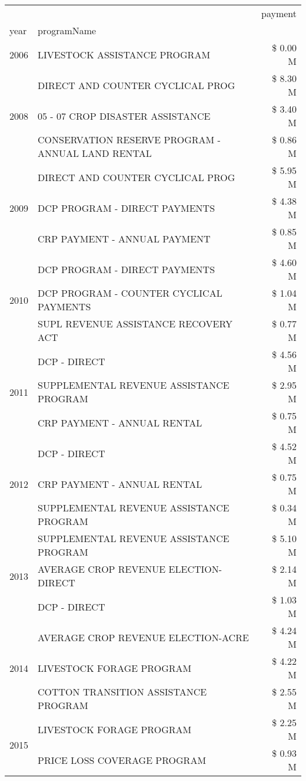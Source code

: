 \begin{tabular}{llr}
\toprule
 &  & payment \\
year & programName &  \\
\midrule
2006 & LIVESTOCK ASSISTANCE PROGRAM & \$ 0.00 M \\
\cline{1-3}
\multirow[t]{3}{*}{2008} & DIRECT AND COUNTER CYCLICAL PROG & \$ 8.30 M \\
 & 05 - 07 CROP DISASTER ASSISTANCE & \$ 3.40 M \\
 & CONSERVATION RESERVE PROGRAM - ANNUAL LAND RENTAL & \$ 0.86 M \\
\cline{1-3}
\multirow[t]{3}{*}{2009} & DIRECT AND COUNTER CYCLICAL PROG & \$ 5.95 M \\
 & DCP PROGRAM - DIRECT PAYMENTS & \$ 4.38 M \\
 & CRP PAYMENT - ANNUAL PAYMENT & \$ 0.85 M \\
\cline{1-3}
\multirow[t]{3}{*}{2010} & DCP PROGRAM - DIRECT PAYMENTS & \$ 4.60 M \\
 & DCP PROGRAM - COUNTER CYCLICAL PAYMENTS & \$ 1.04 M \\
 & SUPL REVENUE ASSISTANCE RECOVERY ACT & \$ 0.77 M \\
\cline{1-3}
\multirow[t]{3}{*}{2011} & DCP - DIRECT & \$ 4.56 M \\
 & SUPPLEMENTAL REVENUE ASSISTANCE PROGRAM & \$ 2.95 M \\
 & CRP PAYMENT - ANNUAL RENTAL & \$ 0.75 M \\
\cline{1-3}
\multirow[t]{3}{*}{2012} & DCP - DIRECT & \$ 4.52 M \\
 & CRP PAYMENT - ANNUAL RENTAL & \$ 0.75 M \\
 & SUPPLEMENTAL REVENUE ASSISTANCE PROGRAM & \$ 0.34 M \\
\cline{1-3}
\multirow[t]{3}{*}{2013} & SUPPLEMENTAL REVENUE ASSISTANCE PROGRAM & \$ 5.10 M \\
 & AVERAGE CROP REVENUE ELECTION-DIRECT & \$ 2.14 M \\
 & DCP - DIRECT & \$ 1.03 M \\
\cline{1-3}
\multirow[t]{3}{*}{2014} & AVERAGE CROP REVENUE ELECTION-ACRE & \$ 4.24 M \\
 & LIVESTOCK FORAGE PROGRAM & \$ 4.22 M \\
 & COTTON TRANSITION ASSISTANCE PROGRAM & \$ 2.55 M \\
\cline{1-3}
\multirow[t]{3}{*}{2015} & LIVESTOCK FORAGE PROGRAM & \$ 2.25 M \\
 & PRICE LOSS COVERAGE PROGRAM & \$ 0.93 M \\

\end{tabular}
